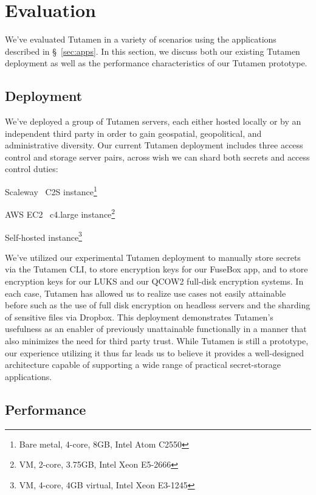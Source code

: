 \section{Evaluation}
\label{sec:eval}

We've evaluated Tutamen in a variety of scenarios using the
applications described in \S~\ref{sec:apps}. In this section, we
discuss both our existing Tutamen deployment as well as the
performance characteristics of our Tutamen prototype.

\subsection{Deployment}
\label{sec:eval:deployment}

We've deployed a group of Tutamen servers, each either hosted locally
or by an independent third party in order to gain geospatial,
geopolitical, and administrative diversity. Our current Tutamen
deployment includes three access control and storage server pairs,
across wish we can shard both secrets and access control duties:

\begin{packed_desc}
\item[Paris, France:] Scaleway~\cite{scaleway} C2S instance\footnote{Bare
  metal, 4-core, 8GB, Intel Atom C2550}
\item[North Virginia:] AWS EC2~\cite{amazon-ec2} c4.large
  instance\footnote{VM, 2-core, 3.75GB, Intel Xeon E5-2666}
\item[Boulder, CO:] Self-hosted instance\footnote{VM, 4-core, 4GB
  virtual, Intel Xeon E3-1245}
\end{packed_desc}

We've utilized our experimental Tutamen deployment to manually store
secrets via the Tutamen CLI, to store encryption keys for our FuseBox
app, and to store encryption keys for our LUKS and our QCOW2 full-disk
encryption systems. In each case, Tutamen has allowed us to realize
use cases not easily attainable before such as the use of full disk
encryption on headless servers and the sharding of sensitive files via
Dropbox. This deployment demonstrates Tutamen's usefulness as an
enabler of previously unattainable functionally in a manner that also
minimizes the need for third party trust. While Tutamen is still a
prototype, our experience utilizing it thus far leads us to believe it
provides a well-designed architecture capable of supporting a wide
range of practical secret-storage applications.

\subsection{Performance}
\label{sec:eval:perf}

